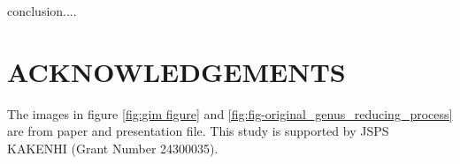 \documentclass[a4paper,twoside]{article}
\begin{document}
\noindent conclusion....



\section*{\uppercase{Acknowledgements}}
\noindent The images in figure \ref{fig:gim figure} and \ref{fig:fig-original_genus_reducing_process}  are from \cite{Gu:2002:GI:566654.566589} paper and presentation file. This study is supported by JSPS KAKENHI (Grant Number 24300035).


\vfill

{\small
}



\vfill
\end{document}
